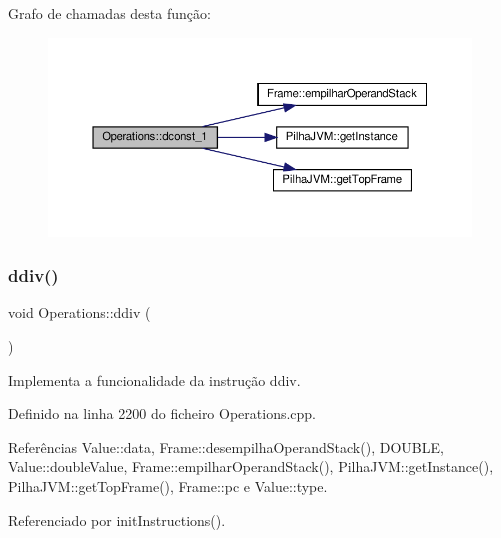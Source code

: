 Grafo de chamadas desta função\+:\nopagebreak
\begin{figure}[H]
\begin{center}
\leavevmode
\includegraphics[width=350pt]{classOperations_a1a704891f81e3b532bf0eaad94429773_cgraph}
\end{center}
\end{figure}
\mbox{\label{classOperations_a3c323c9f0d40e68bf54cd449a55618c3}} 
\subsubsection{\texorpdfstring{ddiv()}{ddiv()}}
{\footnotesize\ttfamily void Operations\+::ddiv (\begin{DoxyParamCaption}{ }\end{DoxyParamCaption})\hspace{0.3cm}{\ttfamily [private]}}



Implementa a funcionalidade da instrução ddiv. 



Definido na linha 2200 do ficheiro Operations.\+cpp.



Referências Value\+::data, Frame\+::desempilha\+Operand\+Stack(), D\+O\+U\+B\+LE, Value\+::double\+Value, Frame\+::empilhar\+Operand\+Stack(), Pilha\+J\+V\+M\+::get\+Instance(), Pilha\+J\+V\+M\+::get\+Top\+Frame(), Frame\+::pc e Value\+::type.



Referenciado por init\+Instructions().

